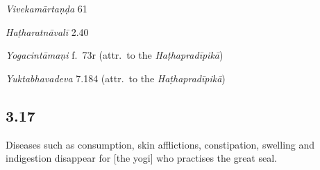 \begin{ekdosis}
\begin{sources}[hp03_016]
\emph{Vivekamārtaṇḍa} 61
\begin{versinnote}
\tl{\var{jīryati] jīryate \vl, jāyate \vl}\\!}
\end{versinnote}
\end{sources}

\begin{testimonia}[hp03_016]
\emph{Haṭharatnāvalī} 2.40
\begin{versinnote}
\end{versinnote}
 
\emph{Yogacintāmaṇi} f.~73r (attr.~to the \emph{Haṭhapradīpikā})
\begin{versinnote}
\end{versinnote}

\emph{Yuktabhavadeva} 7.184 (attr.~to the \emph{Haṭhapradīpikā})
\begin{versinnote}
\end{versinnote}
\end{testimonia}


\subsection*{3.17}
\begin{translation}[hp03_017]
Diseases such as consumption, skin afflictions, constipation, swelling and indigestion disappear for [the yogi] who practises the great seal.
\end{translation}


\end{ekdosis}
